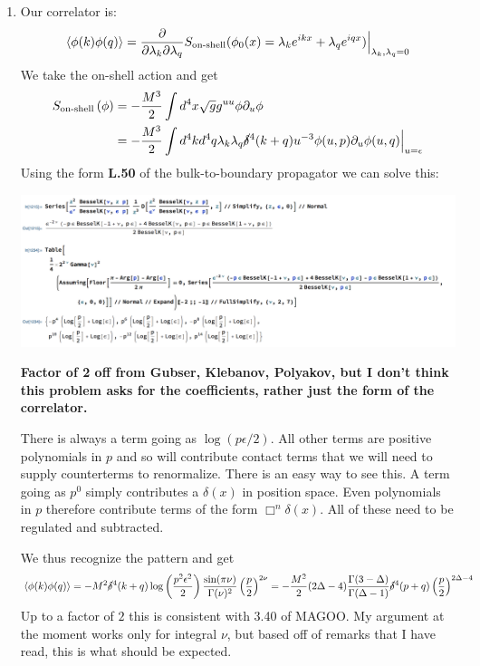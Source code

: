 \documentclass[11pt, class=article, crop=false]{standalone}
\begin{document}
\begin{enumerate}
	\item Our correlator is:
	\[
		\braket{\phi(k) \phi(q)} %
		= \frac{\d}{\d \lambda_k \d \lambda_q} S_{\text{on-shell}}(\phi_0(x)  = \lambda_k e^{i k x} + \lambda_q e^{i q x} )\Big|_{\lambda_k, \lambda_q = 0}
	\]
	We take the on-shell action and get
	\[
	\begin{aligned}
	S_{\text{on-shell}}\left(\phi \right) 
	&= - \frac{M^3}{2} \int d^4 x \sqrt g g^{uu} \phi \partial_u \phi 
	\\&=  - \frac{M^3}{2} \int d^4 k d^4 q \lambda_k \lambda_q \cancel\delta^4(k+q) u^{-3} \phi(u, p) \partial_u \phi(u, q) \Big|_{u = \epsilon}
	\end{aligned}
	\]
	Using the form \textbf{L.50} of the bulk-to-boundary propagator we can solve this:
	\begin{center}
		\includegraphics[scale=0.5]{"Figures/AdS 2-point"}
	\end{center}
    \textbf{Factor of 2 off from Gubser, Klebanov, Polyakov, but I don't think this problem asks for the coefficients, rather just the form of the correlator.}
	
	There is always a term going as $\log (p\epsilon/2)$. All other terms are positive polynomials in $p$ and so will contribute contact terms that we will need to supply counterterms to renormalize. There is an easy way to see this. A term going as $p^0$ simply contributes a $\delta(x)$ in position space. Even polynomials in $p$ therefore contribute terms of the form $\Box^n \delta(x)$. All of these need to be regulated and subtracted.
	
	We thus recognize the pattern and get
	\[
		\braket{\phi(k) \phi(q)} = - M^2 \cancel\delta^4 (k + q) \log \left( \frac{p^2 \epsilon^2}{2} \right) \frac{\sin(\pi \nu)}{\Gamma(\nu)^2} \left(\frac p2\right)^{2 \nu} = -\frac{M^2}{2} (2 \Delta - 4) \frac{\Gamma(3- \Delta)}{\Gamma(\Delta - 1)} \cancel\delta^4(p + q) \left(\frac p2\right)^{2 \Delta - 4}
	\]
	Up to a factor of $2$ this is consistent with 3.40 of MAGOO. My argument at the moment works only for integral $\nu$, but based off of remarks that I have read, this is what should be expected. 
	

\end{enumerate}
\end{document}
